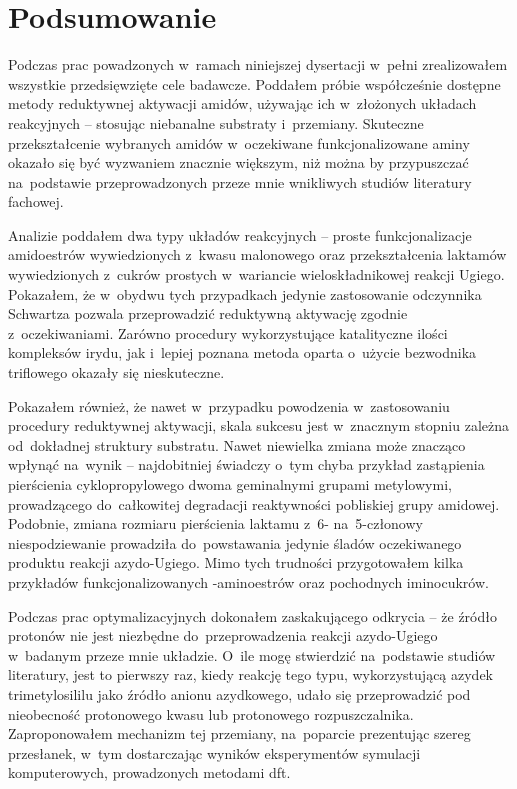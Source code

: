 \chapter{Podsumowanie}\label{chapter:conclusions}
Podczas prac powadzonych w~ramach niniejszej dysertacji w~pełni zrealizowałem wszystkie
  przedsięwzięte cele badawcze.
Poddałem próbie współcześnie dostępne metody reduktywnej aktywacji amidów,
  używając ich w~złożonych układach reakcyjnych \--- stosując niebanalne substraty i~przemiany.
Skuteczne przekształcenie wybranych amidów w~oczekiwane funkcjonalizowane aminy okazało się
  być wyzwaniem znacznie większym, niż można by przypuszczać na~podstawie przeprowadzonych
  przeze mnie wnikliwych studiów literatury fachowej.

Analizie poddałem dwa typy układów reakcyjnych \--- proste funkcjonalizacje amidoestrów
  wywiedzionych z~kwasu malonowego oraz przekształcenia laktamów wywiedzionych
  z~cukrów prostych w~wariancie wieloskładnikowej reakcji Ugiego.
Pokazałem, że w~obydwu tych przypadkach jedynie zastosowanie odczynnika Schwartza pozwala
  przeprowadzić reduktywną aktywację zgodnie z~oczekiwaniami.
Zarówno procedury wykorzystujące katalityczne ilości kompleksów irydu, jak i~lepiej poznana
  metoda oparta o~użycie bezwodnika triflowego okazały się nieskuteczne.

Pokazałem również, że nawet w~przypadku powodzenia w~zastosowaniu procedury reduktywnej aktywacji,
  skala sukcesu jest w~znacznym stopniu zależna od~dokładnej struktury substratu.
Nawet niewielka zmiana może znacząco wpłynąć na~wynik \--- najdobitniej świadczy o~tym chyba
  przykład zastąpienia pierścienia cyklopropylowego dwoma geminalnymi grupami metylowymi,
  prowadzącego do~całkowitej degradacji reaktywności pobliskiej grupy amidowej.
Podobnie, zmiana rozmiaru pierścienia laktamu z~6- na~5-członowy niespodziewanie prowadziła
  do~powstawania jedynie śladów oczekiwanego produktu reakcji azydo-Ugiego.
Mimo tych trudności przygotowałem kilka przykładów funkcjonalizowanych \textbeta-aminoestrów
  oraz pochodnych iminocukrów.

Podczas prac optymalizacyjnych dokonałem zaskakującego odkrycia \--- że źródło protonów nie jest
  niezbędne do~przeprowadzenia reakcji azydo-Ugiego w~badanym przeze mnie układzie.
O~ile mogę stwierdzić na~podstawie studiów literatury, jest to pierwszy raz, kiedy reakcję tego
  typu, wykorzystującą azydek trimetylosililu jako źródło anionu azydkowego,
  udało się przeprowadzić pod nieobecność protonowego kwasu lub protonowego rozpuszczalnika.
Zaproponowałem mechanizm tej przemiany, na~poparcie prezentując szereg przesłanek,
  w~tym dostarczając wyników eksperymentów symulacji komputerowych, prowadzonych metodami \gls{dft}.

